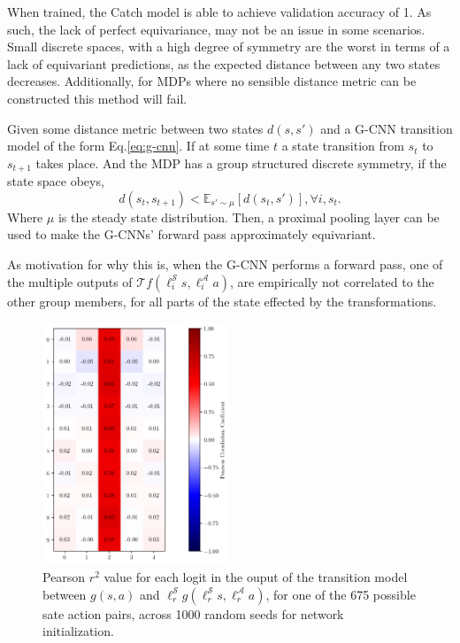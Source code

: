 When trained, the Catch model is able to achieve validation accuracy of 1. As such, the lack of perfect equivariance, may not be an issue in some scenarios. Small discrete spaces, with a high degree of symmetry are the worst in terms of a lack of equivariant predictions, as the expected distance between any two states decreases. Additionally, for MDPs where no sensible distance metric can be constructed this method will fail.
\begin{proposition}
	Given some distance metric between two states $d(s, s')$ and a G-CNN transition model of the form Eq.\ref{eq:g-cnn}. If at some time $t$ a state transition from $s_t$ to $s_{t+1}$ takes place. And the MDP has a group structured discrete symmetry, if the state space obeys,
	\begin{equation}
		d(s_t, s_{t+1}) < \mathbb{E}_{s'\sim \mu}[d(s_t, s')], \forall i, s_t.
	\end{equation}
	Where $\mu$ is the steady state distribution. Then, a proximal pooling layer can be used to make the G-CNNs' forward pass approximately equivariant.
\end{proposition}
As motivation for why this is, when the G-CNN performs a forward pass, one of the multiple outputs of $\mathcal{T} f(\ell_i^\mathcal{S}s,\ell_i^\mathcal{A} a)$, are empirically not correlated to the other group members, for all parts of the state effected by the transformations.
\begin{figure}[h!]
	\centering
	\includegraphics[width = 0.5\textwidth]{Figures/logits_correlation.png}
	\caption{Pearson $r^2$ value for each logit in the ouput of the transition model between $g(s, a)$ and $\ell_r^\mathcal{S}g(\ell_r^\mathcal{S}s,\ell_r^\mathcal{A}a)$, for one of the 675 possible sate action pairs, across 1000 random  seeds for network initialization. }
	\label{fig:logits_correlation}
\end{figure}
